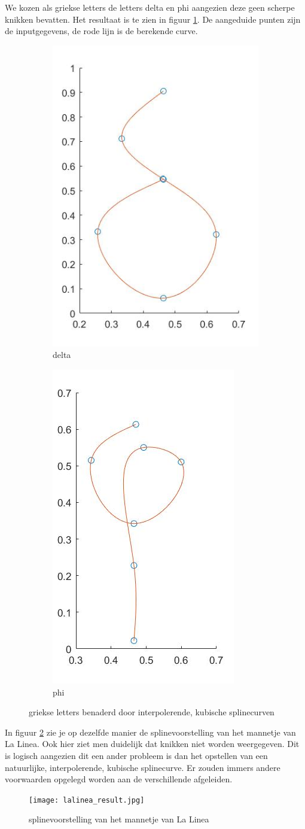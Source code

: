 We kozen als griekse letters de letters delta en phi aangezien deze geen scherpe knikken bevatten. Het resultaat is te zien in figuur \ref{fig:griekse_letters}. De aangeduide punten zijn de inputgegevens, de rode lijn is de berekende curve.

\begin{figure}
\centering
\begin{subfigure}{.5\textwidth}
  \centering
  \includegraphics[width=.4\linewidth]{afbeeldingen/delta_result.jpg}
  \caption{delta}
\end{subfigure}%
\begin{subfigure}{.5\textwidth}
  \centering
  \includegraphics[width=.4\linewidth]{afbeeldingen/phi_result.jpg}
  \caption{phi}
\end{subfigure}
\caption{griekse letters benaderd door interpolerende, kubische splinecurven}
\label{fig:griekse_letters}
\end{figure}

In figuur \ref{fig:lalinea} zie je op dezelfde manier de splinevoorstelling van het mannetje van La Linea. Ook hier ziet men duidelijk dat knikken niet worden weergegeven. Dit is logisch aangezien dit een ander probleem is dan het opstellen van een natuurlijke, interpolerende, kubische splinecurve. Er zouden immers andere voorwaarden opgelegd worden aan de verschillende afgeleiden.

\begin{figure}[htb]
    \centering
    \texttt{[image: lalinea\_result.jpg]}
    \caption{splinevoorstelling van het mannetje van La Linea}
    \label{fig:lalinea}
\end{figure}
